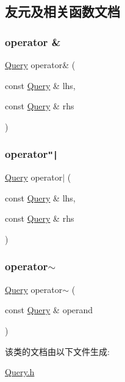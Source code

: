 \subsection{友元及相关函数文档}
\mbox{\label{classQuery_a9669c004503314734a5671692f392812}} 
\subsubsection{\texorpdfstring{operator \&}{operator \&}}
{\footnotesize\ttfamily \hyperlink{classQuery}{Query} operator\& (\begin{DoxyParamCaption}\item[{const \hyperlink{classQuery}{Query} \&}]{lhs,  }\item[{const \hyperlink{classQuery}{Query} \&}]{rhs }\end{DoxyParamCaption})\hspace{0.3cm}{\ttfamily [friend]}}

\mbox{\label{classQuery_a51852e29f84c14afd70921a21cab6074}} 
\subsubsection{\texorpdfstring{operator\texttt{"|}}{operator|}}
{\footnotesize\ttfamily \hyperlink{classQuery}{Query} operator$\vert$ (\begin{DoxyParamCaption}\item[{const \hyperlink{classQuery}{Query} \&}]{lhs,  }\item[{const \hyperlink{classQuery}{Query} \&}]{rhs }\end{DoxyParamCaption})\hspace{0.3cm}{\ttfamily [friend]}}

\mbox{\label{classQuery_afa815c3d9f1296e687770014302bac9a}} 
\subsubsection{\texorpdfstring{operator$\sim$}{operator~}}
{\footnotesize\ttfamily \hyperlink{classQuery}{Query} operator$\sim$ (\begin{DoxyParamCaption}\item[{const \hyperlink{classQuery}{Query} \&}]{operand }\end{DoxyParamCaption})\hspace{0.3cm}{\ttfamily [friend]}}



该类的文档由以下文件生成\+:\begin{DoxyCompactItemize}
\item 
\hyperlink{Query_8h}{Query.\+h}\end{DoxyCompactItemize}
